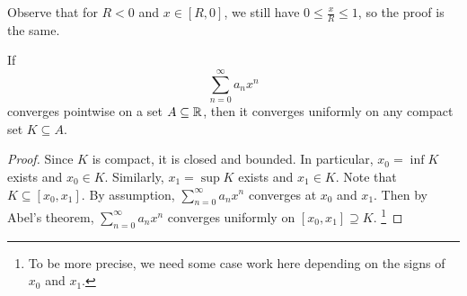 \begin{remark}
  Observe that for $R < 0$ and $x \in [R, 0]$, we still have
  $0 \le \frac{x}{R} \le 1$, so the proof is the same.
\end{remark}

\begin{theorem}
  If
  \[\sum_{n = 0}^\infty a_n x^n\]
  converges pointwise
  on a set $A \subseteq \mathbb{R}$, then it converges
  uniformly on any compact set $K \subseteq A$.
\end{theorem}

\begin{proof}
  Since $K$ is compact, it is closed and bounded.
  In particular, $x_0 = \inf K$ exists and $x_0 \in K$.
  Similarly, $x_1 = \sup K$ exists and $x_1 \in K$.
  Note that $K \subseteq [x_0, x_1]$. By assumption,
  $\sum_{n = 0}^\infty a_n x^n$ converges at $x_0$ and $x_1$.
  Then by Abel's theorem,
  $\sum_{n = 0}^\infty a_n x^n$
  converges uniformly on $[x_0, x_1] \supseteq K$.
  \footnote{To be more precise, we need some case work
  here depending on the signs of $x_0$ and $x_1$.}
\end{proof}
